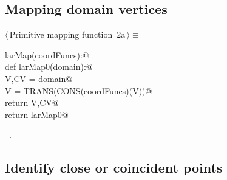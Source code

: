 \documentclass[11pt,oneside]{article}	%
\begin{document}
\subsection{Mapping domain vertices}
\begin{flushleft} \small \label{scrap2}
\protect{}$\langle\,$Primitive mapping function\nobreak\ {\footnotesize 2a}$\,\rangle\equiv$
\vspace{-1ex}
\begin{list}{}{} \item
\mbox{}\verb@def larMap(coordFuncs):@\\
\mbox{}\verb@   def larMap0(domain):@\\
\mbox{}\verb@      V,CV = domain@\\
\mbox{}\verb@      V = TRANS(CONS(coordFuncs)(V))@\\
\mbox{}\verb@      return V,CV@\\
\mbox{}\verb@   return larMap0@\\
\mbox{}\verb@@{\NWsep}
\end{list}
\vspace{-1ex}
\footnotesize\addtolength{\baselineskip}{-1ex}
\begin{list}{}{\setlength{\itemsep}{-\parsep}\setlength{\itemindent}{-\leftmargin}}
\item \NWtxtMacroRefIn\ .
\end{list}
\end{flushleft}

\subsection{Identify close or coincident points}
\end{document}
